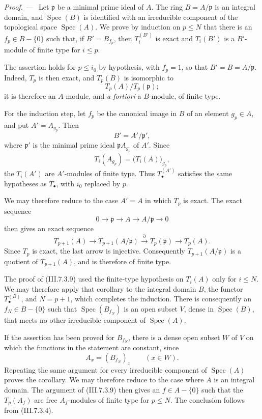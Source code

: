 \documentclass[10pt,oneside]{book}
\newcommand{\Spec}{\operatorname{Spec}}
\newcommand{\sref}[2][]{(#2)}
\newcommand{\oldpage}[2][]{\setcounter{footnote}{0}\marginpar{\scriptsize\textbf{#1}~|~#2}\ignorespaces}
\newenvironment{proof}{\par\medskip\noindent\textit{Proof. ---\ }}{\par}
\begin{document}
\begin{proof}
Let $\mathfrak p$ be a minimal prime ideal of $A$.  The ring
$B=A/\mathfrak p$ is an integral domain, and $\Spec(B)$ is
identified with an irreducible component of the topological
space $\Spec(A)$.  We prove by induction on $p\leq N$ that
there is an $f_p\in B-\{0\}$ such that, if
$B'=B_{f_p}$, then $T_i^{(B')}$ is exact and $T_i(B')$ is a
$B'$-module of finite type for $i\leq p$.

The assertion holds for $p\leq i_0$ by hypothesis, with
$f_p=1$, so that $B'=B=A/\mathfrak p$.  Indeed, $T_p$ is then
exact, and $T_p(B)$ is isomorphic to
\[
  T_p(A)/T_p(\mathfrak p);
\]
it is therefore an $A$-module, and \emph{a fortiori} a
$B$-module, of finite type.

For the induction step, let $f_p$ be the canonical image in
$B$ of an element $g_p\in A$, and put $A'=A_{g_p}$.  Then
\[
  B'=A'/\mathfrak p',
\]
where $\mathfrak p'$ is the minimal prime ideal
$\mathfrak pA_{g_p}$ of $A'$.  Since
\[
  T_i(A_{g_p})=\bigl(T_i(A)\bigr)_{g_p},
\]
the $T_i(A')$ are $A'$-modules of finite type.  Thus
$T_\bullet^{(A')}$ satisfies the same hypotheses as
$T_\bullet$, with $i_0$ replaced by $p$.

We may therefore reduce to the case $A'=A$ in which $T_p$ is
exact.  The exact sequence
\[
  0\longrightarrow\mathfrak p
  \longrightarrow A
  \longrightarrow A/\mathfrak p
  \longrightarrow0
\]
then gives an exact sequence
\[
  T_{p+1}(A)
  \longrightarrow
  T_{p+1}(A/\mathfrak p)
  \xrightarrow{\partial}
  T_p(\mathfrak p)
  \longrightarrow
  T_p(A).
\]
Since $T_p$ is exact, the last arrow is injective.
Consequently $T_{p+1}(A/\mathfrak p)$ is a quotient of
$T_{p+1}(A)$, and is therefore of finite type.

The proof of \sref{III.7.3.9} used the finite-type hypothesis
on $T_i(A)$ only for $i\leq N$.  We may therefore apply that
corollary to the integral domain $B$, the functor
$T_\bullet^{(B)}$, and $N=p+1$, which completes the induction.
There is consequently an $f_N\in B-\{0\}$ such that
$\Spec(B_{f_N})$ is an open subset $V$, dense in $\Spec(B)$,
that meets no other irreducible component of $\Spec(A)$.

\oldpage[III]{185}

If the assertion has been proved for $B_{f_N}$, there is a
dense open subset $W$ of $V$ on which the functions in the
statement are constant, since
\[
  A_x=(B_{f_N})_x
  \qquad(x\in W).
\]
Repeating the same argument for every irreducible component of
$\Spec(A)$ proves the corollary.  We may therefore reduce to
the case where $A$ is an integral domain.  The argument of
\sref{III.7.3.9} then gives an $f\in A-\{0\}$ such that the
$T_p(A_f)$ are free $A_f$-modules of finite type for
$p\leq N$.  The conclusion follows from \sref{III.7.3.4}.
\end{proof}
\end{document}
